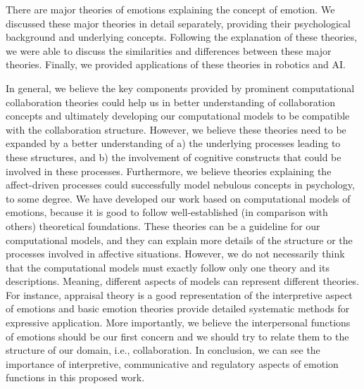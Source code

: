 \documentclass[12pt]{report}
\begin{document}
There are major theories of emotions explaining the concept of emotion. We
discussed these major theories in detail separately, providing their
psychological background and underlying concepts. Following the explanation of
these theories, we were able to discuss the similarities and differences between
these major theories. Finally, we provided applications of these theories in
robotics and AI.

In general, we believe the key components provided by prominent
computational collaboration theories could help us in better understanding of
collaboration concepts and ultimately developing our computational models to
be compatible with the collaboration structure. However, we believe these
theories need to be expanded by a better understanding of a) the underlying
processes leading to these structures, and b) the involvement of cognitive
constructs that could be involved in these processes. Furthermore, we believe
theories explaining the affect-driven processes could successfully model
nebulous concepts in psychology, to some degree.
We have developed our work based on computational models of emotions, because it
is good to follow well-established (in comparison with others) theoretical
foundations. These theories can be a guideline for our computational models, and
they can explain more details of the structure or the processes involved in
affective situations. However, we do not necessarily think that the
computational models must exactly follow only one theory and its descriptions.
Meaning, different aspects of models can represent different theories. For
instance, appraisal theory is a good representation of the interpretive aspect
of emotions and basic emotion theories provide detailed systematic methods for
expressive application. More importantly, we believe the interpersonal functions
of emotions should be our first concern and we should try to relate them to the
structure of our domain, i.e., collaboration. In conclusion, we can see the
importance of interpretive, communicative and regulatory aspects of emotion
functions in this proposed work.
\end{document}
